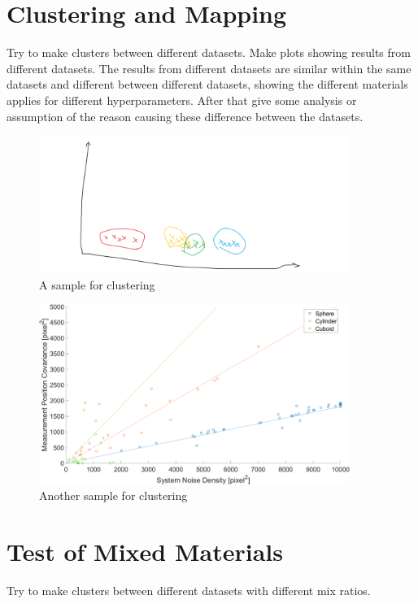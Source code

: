 \section{Clustering and Mapping}

Try to make clusters between different datasets. Make plots showing results from different datasets. The results from different datasets are similar within the same datasets and different between different datasets, showing the different materials applies for different hyperparameters. After that give some analysis or assumption of the reason causing these difference between the datasets. 

\begin{figure}[htbp]
\centering
\includegraphics[width=0.9\textwidth]{figures/KF/sample cluster.png}
\caption{A sample for clustering}
\label{cluster1}
\end{figure}

\begin{figure}[htbp]
\centering
\includegraphics[width=0.9\textwidth]{figures/KF/CV result cluster.png}
\caption{Another sample for clustering}
\label{cluster2}
\end{figure}


\section{Test of Mixed Materials}

Try to make clusters between different datasets with different mix ratios.


